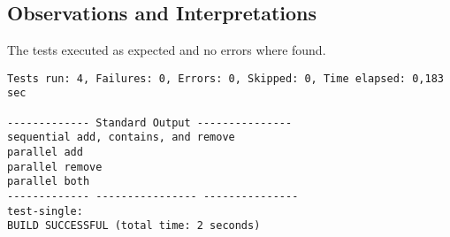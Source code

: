
\subsection{Observations and Interpretations}

\par
The tests executed as expected and no errors where found. 
\begin{lstlisting}[frame=single,breaklines=true]
Tests run: 4, Failures: 0, Errors: 0, Skipped: 0, Time elapsed: 0,183 sec

------------- Standard Output ---------------
sequential add, contains, and remove
parallel add
parallel remove
parallel both
------------- ---------------- ---------------
test-single:
BUILD SUCCESSFUL (total time: 2 seconds)
\end{lstlisting}




